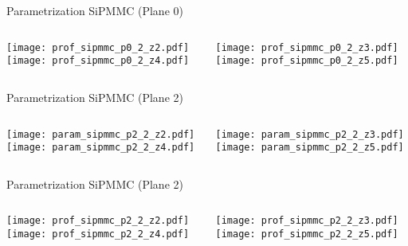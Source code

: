\documentclass{beamer}
\begin{document}
\begin{frame}{Parametrization SiPMMC (Plane 0)}
	\begin{columns}[onlytextwidth]
		\begin{column}{0.5\textwidth}
			\texttt{[image: prof\_sipmmc\_p0\_2\_z2.pdf]} \\
			\texttt{[image: prof\_sipmmc\_p0\_2\_z4.pdf]}
		 \end{column}
		 \begin{column}{0.5\textwidth}
			\texttt{[image: prof\_sipmmc\_p0\_2\_z3.pdf]} \\
			\texttt{[image: prof\_sipmmc\_p0\_2\_z5.pdf]}
		 \end{column}
 \end{columns}
\end{frame}

\begin{frame}{Parametrization SiPMMC (Plane 2)}
	\begin{columns}[onlytextwidth]
		\begin{column}{0.5\textwidth}
			\texttt{[image: param\_sipmmc\_p2\_2\_z2.pdf]} \\
			\texttt{[image: param\_sipmmc\_p2\_2\_z4.pdf]}
		 \end{column}
		 \begin{column}{0.5\textwidth}
			\texttt{[image: param\_sipmmc\_p2\_2\_z3.pdf]} \\
			\texttt{[image: param\_sipmmc\_p2\_2\_z5.pdf]}
		 \end{column}
 \end{columns}
\end{frame}

\begin{frame}{Parametrization SiPMMC (Plane 2)}
	\begin{columns}[onlytextwidth]
		\begin{column}{0.5\textwidth}
			\texttt{[image: prof\_sipmmc\_p2\_2\_z2.pdf]} \\
			\texttt{[image: prof\_sipmmc\_p2\_2\_z4.pdf]}
		 \end{column}
		 \begin{column}{0.5\textwidth}
			\texttt{[image: prof\_sipmmc\_p2\_2\_z3.pdf]} \\
			\texttt{[image: prof\_sipmmc\_p2\_2\_z5.pdf]}
		 \end{column}
 \end{columns}
\end{frame}
\end{document}
